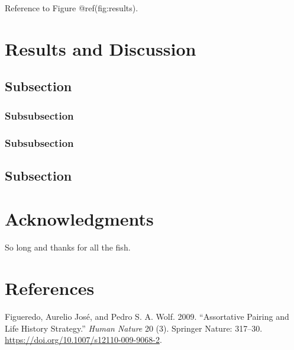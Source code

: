 \documentclass[fleqn,10pt,lineno]{wlpeerj} %
\begin{document}
Reference to Figure @ref(fig:results).

\hypertarget{results-and-discussion}{%
\section*{Results and Discussion}\label{results-and-discussion}}

\lipsum[10]

\hypertarget{subsection-2}{%
\subsection*{Subsection}\label{subsection-2}}

\lipsum[11]

\hypertarget{subsubsection}{%
\subsubsection*{Subsubsection}\label{subsubsection}}

\lipsum[12]

\hypertarget{subsubsection-1}{%
\subsubsection*{Subsubsection}\label{subsubsection-1}}

\lipsum[14]

\hypertarget{subsection-3}{%
\subsection*{Subsection}\label{subsection-3}}

\lipsum[15-20]

\hypertarget{acknowledgments}{%
\section*{Acknowledgments}\label{acknowledgments}}

So long and thanks for all the fish.

\hypertarget{references}{%
\section*{References}\label{references}}

\hypertarget{refs}{}
\leavevmode\hypertarget{ref-Figueredo:2009dg}{}%
Figueredo, Aurelio José, and Pedro S. A. Wolf. 2009. ``Assortative
Pairing and Life History Strategy.'' \emph{Human Nature} 20 (3).
Springer Nature: 317--30.
\url{https://doi.org/10.1007/s12110-009-9068-2}.
\end{document}
